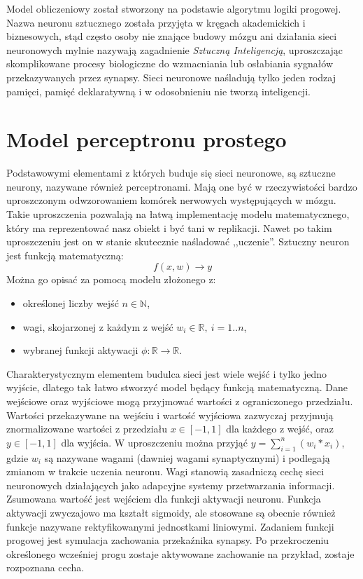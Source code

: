 \documentclass[12pt,a4paper,twoside,titlepage,openright]{book}
\begin{document}
Model obliczeniowy został stworzony na podstawie algorytmu logiki progowej. 
Nazwa neuronu sztucznego została przyjęta w kręgach akademickich i biznesowych, stąd często osoby nie znające budowy mózgu ani działania sieci neuronowych mylnie nazywają zagadnienie \textit{Sztuczną Inteligencją}, uproszczając skomplikowane procesy biologiczne do wzmacniania lub osłabiania sygnałów przekazywanych przez synapsy. Sieci neuronowe naśladują tylko jeden rodzaj pamięci, pamięć deklaratywną i w odosobnieniu nie tworzą inteligencji.

\section{Model perceptronu prostego}
Podstawowymi elementami z których buduje się sieci neuronowe, są sztuczne neurony, nazywane również perceptronami. Mają one być w rzeczywistości bardzo uproszczonym odwzorowaniem komórek nerwowych występujących w mózgu. Takie uproszczenia pozwalają na łatwą implementację modelu matematycznego, który ma reprezentować nasz obiekt i być tani w replikacji. Nawet po takim uproszczeniu jest on w stanie skutecznie naśladować ,,uczenie''.
Sztuczny neuron jest funkcją matematyczną: $$f(x,w) \to y$$ Można go opisać za pomocą modelu złożonego z:
\begin{itemize}
\item określonej liczby wejść \(n \in \mathbb{N}\),
\item wagi, skojarzonej z każdym z wejść \(w_i \in \mathbb{R},~ i=1..n\),
\item wybranej funkcji aktywacji \(\phi: \mathbb{R} \to \mathbb{R} \).
\end{itemize}

Charakterystycznym elementem budulca sieci jest wiele wejść i tylko jedno wyjście, dlatego tak łatwo stworzyć model będący funkcją matematyczną.
Dane wejściowe oraz wyjściowe mogą przyjmować wartości z ograniczonego przedziału. Wartości przekazywane na wejściu i wartość wyjściowa zazwyczaj przyjmują znormalizowane wartości z przedziału \(x \in [-1, 1]\) dla każdego z wejść, oraz \(y \in [-1,1]\) dla wyjścia. W uproszczeniu można przyjąć \(y = \sum\limits_{i=1}^n (w_i * x_i)\), gdzie \(w_i\) są nazywane wagami (dawniej wagami synaptycznymi) i podlegają zmianom w trakcie uczenia neuronu. Wagi stanowią zasadniczą cechę sieci neuronowych działających jako adapcyjne systemy przetwarzania informacji. Zsumowana wartość jest wejściem dla funkcji aktywacji neuronu. Funkcja aktywacji zwyczajowo ma kształt sigmoidy, ale stosowane są obecnie również funkcje nazywane rektyfikowanymi jednostkami liniowymi. Zadaniem funkcji progowej jest symulacja zachowania przekaźnika synapsy. Po przekroczeniu określonego wcześniej progu zostaje aktywowane zachowanie na przykład, zostaje rozpoznana cecha.
\end{document}
